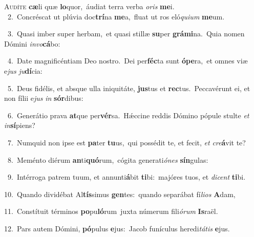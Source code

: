 \lettrine{\initial\textcolor{\initialcolor}{A}}{udíte} \textbf{cæ}\-li quæ \textbf{lo}\-quor,~\star áudiat terra verba \textit{o}\-\textit{ris} \textbf{me}\-i.\\
{\numbfont\textcolor{\numbcolor}{~2.}}~Concréscat ut plúvia doc\-\textbf{trí}\-na \textbf{me}\-a,~\star fluat ut ros eló\-\textit{qui}\-\textit{um} \textbf{me}\-um.\par
{\numbfont\textcolor{\numbcolor}{~3.}}~Quasi imber super herbam,~\dagger et quasi stillæ \textbf{su}\-per \textbf{grá}\-\textbf{mi}na.~\star Quia nomen Dómini \textit{in}\-\textit{vo}\textbf{cá}bo:\par
{\numbfont\textcolor{\numbcolor}{~4.}}~Date magnificéntiam Deo nostro.~\dagger Dei per\-\textbf{féc}\-ta sunt \textbf{ó}\-\textbf{pe}ra,~\star et omnes viæ e\textit{jus} \textit{ju}\-\textbf{dí}cia:\par
{\numbfont\textcolor{\numbcolor}{~5.}}~Deus fidélis, et absque ulla iniquitáte, \textbf{jus}\-tus et \textbf{rec}\-tus.~\star Peccavérunt ei, et non fílii e\textit{jus} \textit{in} \textbf{sór}\-dibus:\par
{\numbfont\textcolor{\numbcolor}{~6.}}~Generátio prava \textbf{at}\-que per\-\textbf{vér}\-sa.~\star Hǽccine reddis Dómino pópule stulte \textit{et} \textit{in}\-\textbf{sí}piens?\par
{\numbfont\textcolor{\numbcolor}{~7.}}~Numquid non ipse est \textbf{pa}\-ter \textbf{tu}\-us,~\star qui possédit te, et fecit, \textit{et} \textit{cre}\-\textbf{á}vit te?\par
{\numbfont\textcolor{\numbcolor}{~8.}}~Meménto diérum \textbf{an}\-ti\-\textbf{quó}\-rum,~\star cógita generati\-\textit{ó}\-\textit{nes} \textbf{sín}\-gulas:\par
{\numbfont\textcolor{\numbcolor}{~9.}}~Intérroga patrem tuum, et annunti\-\textbf{á}\-bit \textbf{ti}\-bi:~\star majóres tuos, et \textit{di}\-\textit{cent} \textbf{ti}\-bi.\par
{\numbfont\textcolor{\numbcolor}{10.}}~Quando dividébat Al\-\textbf{tís}\-simus \textbf{gen}\-tes:~\star quando separábat fí\-\textit{li}\-\textit{os} \textbf{A}\-dam,\par
{\numbfont\textcolor{\numbcolor}{11.}}~Constítuit términos \textbf{po}\-pu\-\textbf{ló}\-rum~\star juxta númerum fili\-\textit{ó}\-\textit{rum} \textbf{Is}\-raël.\par
{\numbfont\textcolor{\numbcolor}{12.}}~Pars autem Dómini, \textbf{pó}\-pulus \textbf{e}\-jus:~\star Jacob funículus heredi\-\textit{tá}\-\textit{tis} \textbf{e}\-jus.\par
